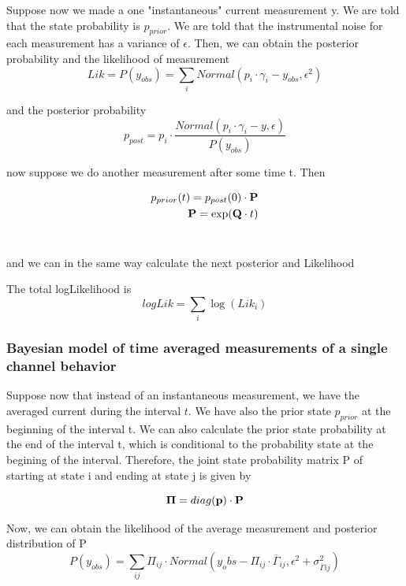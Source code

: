 \documentclass[pdflatex,sn-mathphys-num]{sn-jnl}%
\theoremstyle{thmstyleone}%
\theoremstyle{thmstyletwo}%
\theoremstyle{thmstylethree}%
\begin{document}
Suppose now we made a one "instantaneous" current measurement y. We are told that the state
 probability is $p_{prior}$. We are told that the instrumental noise for each measurement has a variance of $\epsilon$. 
Then, we can obtain the posterior probability and the likelihood of measurement 
\begin{equation}
Lik=P(y_{obs})= \sum_i Normal (p_i \cdot \gamma_i - y_{obs}, \epsilon^2 ) 
\end{equation}

 and the posterior probability
\begin{equation}
p_{post} = p_i \cdot \frac {Normal(p_i \cdot \gamma_i -y, \epsilon)}{P(y_{obs})}
\end{equation}

now suppose we do another measurement after some time t. Then 

\begin{align}
p_{prior}(t) = p_{post}(0) \cdot \bold P  \nonumber \\
\bold P = \exp(\bold Q \cdot t)
\end{align}
\ 

and we can in the same way calculate the next posterior and Likelihood

The total logLikelihood is
\begin{equation}
logLik= \sum_i \log(Lik_i)
\end{equation}

 


\subsubsection{Bayesian model of time averaged measurements of a single channel behavior}
Suppose now that instead of an instantaneous measurement, we have the averaged current during the interval $t$. 
We have also the prior state $p_{prior}$ at the beginning of the interval t. We can also calculate the prior state probability at the end of the interval t, which is conditional to the probability state at the begining of the interval. Therefore, the joint state probability matrix P  of starting at state i and ending at state j is given by

\begin{equation}
\bold \Pi  = diag (\bold p) \cdot \bold P
\end{equation}

Now, we can obtain the likelihood of the average measurement and posterior distribution of P 
\begin{equation}
P(y_{obs}) =\sum_{ij} \Pi_{ij} \cdot Normal \left(y_obs-{\Pi_{ij} \cdot {\overline \Gamma}_{ij}} , \epsilon^2 + \sigma^2_{\overline{\Gamma} ij} \right)
\end{equation}
\end{document}
